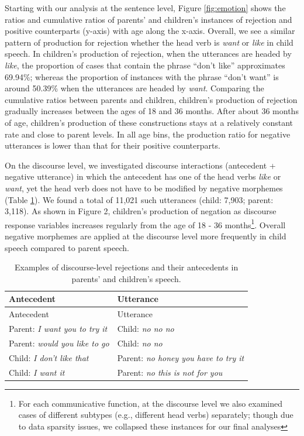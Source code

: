 \documentclass[
  english,
  man,floatsintext]{apa6}
\begin{document}
Starting with our analysis at the sentence level, Figure \ref{fig:emotion} shows the ratios and cumulative ratios of parents' and children's instances of rejection and positive counterparts (y-axis) with age along the x-axis. Overall, we see a similar pattern of production for rejection whether the head verb is \emph{want} or \emph{like} in child speech. In children's production of rejection, when the utterances are headed by \emph{like}, the proportion of cases that contain the phrase ``don't like'' approximates 69.94\%; whereas the proportion of instances with the phrase ``don't want'' is around 50.39\% when the utterances are headed by \emph{want}. Comparing the cumulative ratios between parents and children, children's production of rejection gradually increases between the ages of 18 and 36 months. After about 36 months of age, children's production of these constructions stays at a relatively constant rate and close to parent levels. In all age bins, the production ratio for negative utterances is lower than that for their positive counterparts.

On the discourse level, we investigated discourse interactions (antecedent + negative utterance) in which the antecedent has one of the head verbs \emph{like} or \emph{want}, yet the head verb does not have to be modified by negative morphemes (Table \ref{tab:disreject}). We found a total of 11,021 such utterances (child: 7,903; parent: 3,118). As shown in Figure 2, children's production of negation as discourse response variables increases regularly from the age of 18 - 36 months\footnote{For each communicative function, at the discourse level we also examined cases of different subtypes (e.g., different head verbs) separately; though due to data sparsity issues, we collapsed these instances for our final analyses}. Overall negative morphemes are applied at the discourse level more frequently in child speech compared to parent speech.

\begin{longtable}[]{@{}ll@{}}
\caption{\label{tab:disreject} Examples of discourse-level rejections and their antecedents in parents' and children's speech.}\tabularnewline
\toprule
Antecedent & Utterance \\
\midrule
\endfirsthead
\toprule
Antecedent & Utterance \\
\midrule
\endhead
Parent: \emph{I want you to try it} & Child: \emph{no no no} \\
Parent: \emph{would you like to go} & Child: \emph{no no} \\
Child: \emph{I don't like that} & Parent: \emph{no honey you have to try it} \\
Child: \emph{I want it} & Parent: \emph{no this is not for you} \\
\bottomrule
\end{longtable}
\end{document}
